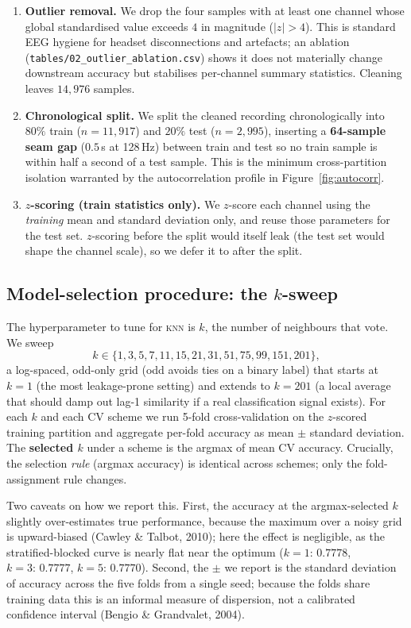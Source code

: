 \documentclass[11pt]{article}
\newcommand{\knn}{\textsc{knn}}
\begin{document}
\begin{enumerate}[leftmargin=1.5em,itemsep=2pt,topsep=2pt]
  \item \textbf{Outlier removal.} We drop the four samples with at least
    one channel whose global standardised value exceeds $4$ in magnitude
    ($|z| > 4$). This is standard EEG hygiene for headset disconnections and
    artefacts; an ablation (\texttt{tables/02\_outlier\_ablation.csv}) shows
    it does not materially change downstream accuracy but stabilises
    per-channel summary statistics. Cleaning leaves $14{,}976$ samples.
  \item \textbf{Chronological split.} We split the cleaned recording
    chronologically into $80\%$ train ($n = 11{,}917$) and $20\%$ test
    ($n = 2{,}995$), inserting a \textbf{64-sample seam gap} ($0.5$\,s at
    128\,Hz) between train and test so no train sample is within half a
    second of a test sample. This is the minimum cross-partition isolation
    warranted by the autocorrelation profile in
    Figure~\ref{fig:autocorr}.
  \item \textbf{$z$-scoring (train statistics only).} We $z$-score each
    channel using the \emph{training} mean and standard deviation only,
    and reuse those parameters for the test set. $z$-scoring before the
    split would itself leak (the test set would shape the channel scale),
    so we defer it to after the split.
\end{enumerate}

\subsection{Model-selection procedure: the $k$-sweep}

The hyperparameter to tune for \knn{} is $k$, the number of neighbours that
vote. We sweep
\[
  k \in \{1,3,5,7,11,15,21,31,51,75,99,151,201\},
\]
a log-spaced, odd-only grid (odd avoids ties on a binary label) that starts
at $k=1$ (the most leakage-prone setting) and extends to $k=201$ (a local
average that should damp out lag-1 similarity if a real classification
signal exists). For each $k$ and each CV scheme we run 5-fold
cross-validation on the $z$-scored training partition and aggregate
per-fold accuracy as mean $\pm$ standard deviation. The \textbf{selected
$k$} under a scheme is the argmax of mean CV accuracy. Crucially, the
selection \emph{rule} (argmax accuracy) is identical across schemes; only
the fold-assignment rule changes.

Two caveats on how we report this. First, the accuracy at the
argmax-selected $k$ slightly over-estimates true performance, because the
maximum over a noisy grid is upward-biased (Cawley \& Talbot, 2010); here
the effect is negligible, as the stratified-blocked curve is nearly flat
near the optimum ($k{=}1{:}\,0.7778$, $k{=}3{:}\,0.7777$,
$k{=}5{:}\,0.7770$). Second, the $\pm$ we report is the standard deviation
of accuracy across the five folds from a single seed; because the folds
share training data this is an informal measure of dispersion, not a
calibrated confidence interval (Bengio \& Grandvalet, 2004).
\end{document}
